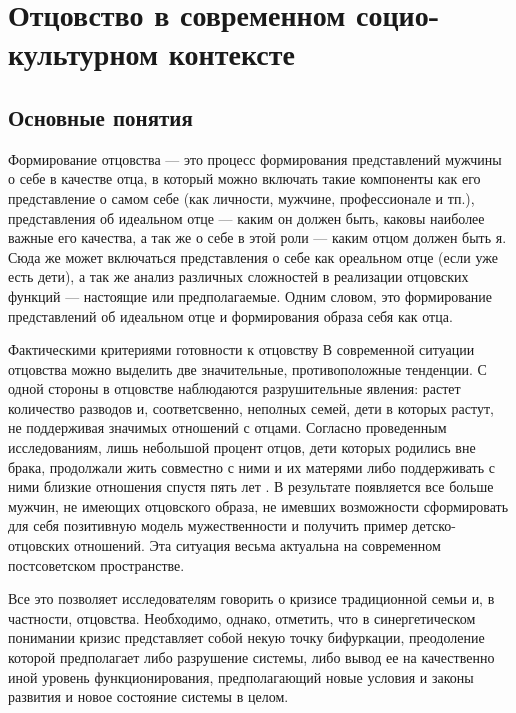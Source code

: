 \documentclass{../../common/thesisbyxetex}
\begin{document}
\chapter{Отцовство в современном социо-культурном контексте}

\section{Основные понятия}

Формирование отцовства --- это процесс формирования представлений мужчины о себе в качестве отца, в
который можно включать такие компоненты как его представление о самом себе (как личности, мужчине,
профессионале и тп.), представления об идеальном отце --- каким он должен быть, каковы наиболее
важные его качества, а так же о себе в этой роли --- каким отцом должен быть я. Сюда же может
включаться представления о себе как ореальном отце (если уже есть дети), а так же анализ различных
сложностей в реализации отцовских функций --- настоящие или предполагаемые.
Одним словом, это формирование представлений об идеальном отце и формирования образа себя как отца.

Фактическими критериями готовности  к отцовству
В современной ситуации отцовства можно выделить две значительные, противоположные
тенденции. С одной стороны  в отцовстве наблюдаются разрушительные явления: растет количество
разводов и, соответсвенно, неполных семей, дети в которых растут, не поддерживая значимых отношений
с отцами. Согласно проведенным исследованиям, лишь небольшой процент отцов, дети которых
родились вне брака, продолжали жить совместно с ними и их матерями либо поддерживать с ними близкие
отношения спустя пять лет \cite{long}. В результате появляется все больше мужчин, не имеющих
отцовского образа, не имевших возможности сформировать для себя позитивную модель мужественности и
получить пример детско-отцовских отношений. Эта ситуация весьма актуальна на современном
постсоветском пространстве.



Все это позволяет исследователям говорить о кризисе традиционной семьи и, в частности, отцовства.
Необходимо, однако, отметить, что в синергетическом понимании кризис представляет собой некую точку
бифуркации, преодоление которой предполагает либо разрушение системы, либо вывод ее на качественно
иной уровень функционирования, предполагающий новые условия и законы развития и новое состояние
системы в целом.
\end{document}
